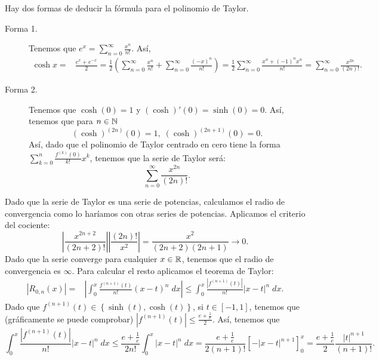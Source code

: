 \documentclass{article}
\begin{document}
\begin{sol}
Hay dos formas de deducir la fórmula para el polinomio de Taylor. 
\begin{description}
\item[Forma 1.] Tenemos que $\displaystyle e^{x} = \sum^{\infty}_{n = 0}\frac{x^{n}}{n!} $. Así,
	\[
	\begin{split}
		\cosh x = & \frac{e^{x}+e^{-x}}{2} = \frac{1}{2}\left(\sum^{\infty}_{n = 0}\frac{x^{n}}{n!} + \sum^{\infty}_{n = 0}\frac{\left(-x\right)^{n}}{n!}\right) = \frac{1}{2} \sum^{\infty}_{n = 0}\frac{x^{n} + \left(-1\right)^{n}x^{n}}{n!} = \sum^{\infty}_{n = 0}\frac{x^{2n}}{\left(2n\right)!} .
	\end{split}
	\]
\item[Forma 2.]	Tenemos que $\displaystyle \cosh\left(0\right) = 1 $ y $\displaystyle \left(\cosh\right)'\left(0\right) = \sinh\left(0\right) = 0 $. Así, tenemos que para $\displaystyle n \in \mathbb{N} $ 
	\[\left(\cosh \right)^{(2n)} \left(0\right) = 1, \; \left(\cosh\right)^{(2n+1)}\left(0\right) = 0.\]
	Así, dado que el polinomio de Taylor centrado en cero tiene la forma $\displaystyle \sum^{n}_{k = 0}\frac{f^{\left(k\right)}\left(0\right)}{k!}x^{k} $, tenemos que la serie de Taylor será:
\[\sum^{\infty}_{n = 0}\frac{x^{2n}}{\left(2n\right)!} .\]
\end{description}
Dado que la serie de Taylor es una serie de potencias, calculamos el radio de convergencia como lo haríamos con otras series de potencias. Aplicamos el criterio del cociente:
\[ \left|\frac{x^{2n+2}}{\left(2n+2\right)!}\right| \left|\frac{\left(2n\right)!}{x^{2}}\right| = \frac{x^{2}}{\left(2n+2\right)\left(2n+1\right)}\to 0 .\]
Dado que la serie converge para cualquier $\displaystyle x \in \mathbb{R} $, tenemos que el radio de convergencia es $\displaystyle \infty $. Para calcular el resto aplicamos el teorema de Taylor:
\[
\begin{split}
	\left|R_{0,n}\left(x\right)\right| = & \left|\int^{x}_{0} \frac{f^{\left(n+1\right)}\left(t\right)}{n!}\left(x-t\right)^{n} \; dx\right| \leq \int^{x}_{0} \frac{ \left|f^{\left(n+1\right)}\left(t\right)\right|}{n!} \left|x-t\right|^{n} \; dx  .
\end{split}
\]
Dado que $\displaystyle f^{\left(n+1\right)}\left(t\right) \in \left\{ \sinh\left(t\right), \cosh\left(t\right)\right\}  $, si $\displaystyle t \in \left[-1,1\right]  $, tenemos que (gráficamente se puede comprobar) $\displaystyle \left|f^{\left(n+1\right)}\left(t\right)\right|\leq \frac{e + \frac{1}{e}}{2} $. Así, tenemos que
\[\int^{x}_{0} \frac{ \left|f^{\left(n+1\right)}\left(t\right)\right|}{n!} \left|x-t\right|^{n} \; dx \leq \frac{e+\frac{1}{e}}{2n!}\int^{x}_{0} \left|x-t\right|^{n} \; dx = \frac{e+\frac{1}{e}}{2\left(n+1\right)!}\left[- \left|x-t\right|^{n+1}\right] ^{x}_{0}  = \frac{e+\frac{1}{e}}{2} \frac{ \left|t\right|^{n+1}}{\left(n+1\right)!}.\]

\end{sol}
\end{document}
